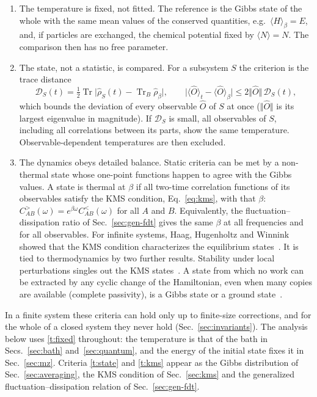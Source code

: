 \documentclass[10pt,a4paper]{article}
\newcommand{\Tr}{\operatorname{Tr}}
\begin{document}
\begin{enumerate}[label=(T\arabic*), leftmargin=3.0em]
\item \label{t:fixed} The temperature is fixed, not fitted. The reference is the Gibbs state of the whole with the same mean values of the conserved quantities, e.g.\ $ \langle H \rangle_\beta = E $, and, if particles are exchanged, the chemical potential fixed by $ \langle N \rangle = N $. The comparison then has no free parameter.
\item \label{t:state} The state, not a statistic, is compared. For a subsystem $ S $ the criterion is the trace distance
\begin{equation}
  \mathcal D_S(t) = \tfrac12 \Tr \big| \hat\rho_S(t) - \Tr_B \hat\rho_\beta \big| ,
  \qquad
  \big| \langle \hat O \rangle_t - \langle \hat O \rangle_\beta \big| \le 2 \Vert \hat O \Vert \, \mathcal D_S(t) ,
  \label{eq:trace-criterion}
\end{equation}
which bounds the deviation of every observable $ \hat O $ of $ S $ at once ($ \Vert\hat O\Vert $ is its largest eigenvalue in magnitude). If $ \mathcal D_S $ is small, all observables of $ S $, including all correlations between its parts, show the same temperature. Observable-dependent temperatures are then excluded.
\item \label{t:kms} The dynamics obeys detailed balance. Static criteria can be met by a non-thermal state whose one-point functions happen to agree with the Gibbs values. A state is thermal at $ \beta $ if all two-time correlation functions of its observables satisfy the KMS condition, Eq.~\eqref{eq:kms}, with that $ \beta $: $ C^>_{AB}(\omega) = e^{\beta\omega} C^<_{AB}(\omega) $ for all $ A $ and $ B $. Equivalently, the fluctuation--dissipation ratio of Sec.~\ref{sec:gen-fdt} gives the same $ \beta $ at all frequencies and for all observables. For infinite systems, Haag, Hugenholtz and Winnink showed that the KMS condition characterizes the equilibrium states~\cite{HHW1967}. It is tied to thermodynamics by two further results. Stability under local perturbations singles out the KMS states~\cite{HKTP1974}. A state from which no work can be extracted by any cyclic change of the Hamiltonian, even when many copies are available (complete passivity), is a Gibbs state or a ground state~\cite{PuszWoronowicz1978,Lenard1978}.
\end{enumerate}
In a finite system these criteria can hold only up to finite-size corrections, and for the whole of a closed system they never hold (Sec.~\ref{sec:invariants}).
The analysis below uses \ref{t:fixed} throughout: the temperature is that of the bath in Secs.~\ref{sec:bath} and~\ref{sec:quantum}, and the energy of the initial state fixes it in Sec.~\ref{sec:mz}.
Criteria \ref{t:state} and \ref{t:kms} appear as the Gibbs distribution of Sec.~\ref{sec:averaging}, the KMS condition of Sec.~\ref{sec:kms} and the generalized fluctuation--dissipation relation of Sec.~\ref{sec:gen-fdt}.
\end{document}
